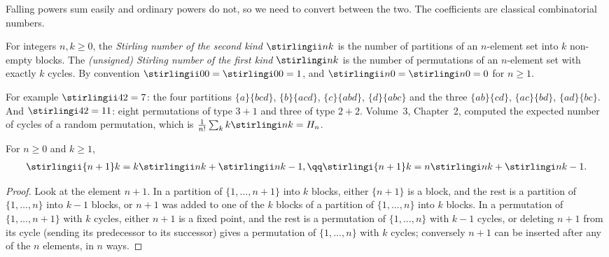 Falling powers sum easily and ordinary powers do not, so we need to convert between the two. The coefficients are
classical combinatorial numbers.

\begin{definition}
For integers $n,k\ge0$, the \emph{Stirling number of the second kind} $\stirlingii nk$ is the number of partitions of an
$n$-element set into $k$ non-empty blocks. The \emph{(unsigned) Stirling number of the first kind} $\stirlingi nk$ is the
number of permutations of an $n$-element set with exactly $k$ cycles. By convention $\stirlingii00=\stirlingi00=1$, and
$\stirlingii n0=\stirlingi n0=0$ for $n\ge1$.
\end{definition}

For example $\stirlingii42=7$: the four partitions $\{a\}\{bcd\}$, $\{b\}\{acd\}$, $\{c\}\{abd\}$, $\{d\}\{abc\}$ and
the three $\{ab\}\{cd\}$, $\{ac\}\{bd\}$, $\{ad\}\{bc\}$. And $\stirlingi42=11$: eight permutations of type
$3+1$ and three of type $2+2$. Volume~3, Chapter~2, computed the expected number of cycles of a random permutation,
which is $\frac1{n!}\sum_kk\stirlingi nk=H_n$.

\begin{proposition}\label{prop:stirlingrec}
For $n\ge0$ and $k\ge1$,
\[
\begin{gathered}\stirlingii{n+1}k=k\stirlingii nk+\stirlingii n{k-1},\qq\stirlingi{n+1}k=n\stirlingi nk+\stirlingi n{k-1}.\end{gathered}
\]
\end{proposition}
\begin{proof}
Look at the element $n+1$. In a partition of $\{1,\dots,n+1\}$ into $k$ blocks, either $\{n+1\}$ is a block, and the
rest is a partition of $\{1,\dots,n\}$ into $k-1$ blocks, or $n+1$ was added to one of the $k$ blocks of a partition
of $\{1,\dots,n\}$ into $k$ blocks. In a permutation of $\{1,\dots,n+1\}$ with $k$ cycles, either $n+1$ is a fixed
point, and the rest is a permutation of $\{1,\dots,n\}$ with $k-1$ cycles, or deleting $n+1$ from its cycle (sending its
predecessor to its successor) gives a permutation of $\{1,\dots,n\}$ with $k$ cycles; conversely $n+1$ can be inserted
after any of the $n$ elements, in $n$ ways.
\end{proof}

